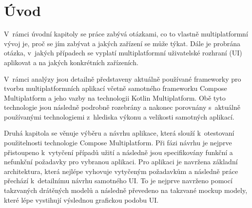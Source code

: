 \chapter{Úvod}
\setcounter{page}{1}



V~rámci úvodní kapitoly se práce zabývá otázkami, co to vlastně multiplatformní vývoj je, proč se jím zabývat a jakých zařízení se může týkat.
Dále je probrána otázka, v~jakých případech se vyplatí multiplatformní uživatelské rozhraní (UI) aplikovat a na jakých konkrétních zařízeních. 





V~rámci analýzy jsou detailně představeny aktuálně používané frameworky pro tvorbu multiplatformních aplikací včetně samotného
frameworku Compose Multiplatform a jeho vazby na technologii Kotlin Multiplatform. Obě tyto technologie jsou následně podrobně rozebrány
a nakonec porovnány s~aktuálně používanými technologiemi z~hlediska výkonu a velikosti samotných aplikací.

\medskip

Druhá kapitola se věnuje výběru a návrhu aplikace, která slouží k~otestovaní použitelnosti technologie Compose Multiplatform.
Při fázi návrhu je nejprve přistoupeno k~vytyčení případů užití a následně jsou specifikovány funkční a nefunkční požadavky pro vybranou aplikaci.
Pro aplikaci je navržena základní architektura, která nejlépe vyhovuje vytyčeným požadavkům a následně práce přechází k~detailnímu
návrhu samotného UI. To je nejprve navrženo pomocí takzvaných drátěných modelů a následně převedeno na takzvané mockup modely, které
lépe vystihují výslednou grafickou podobu UI.

